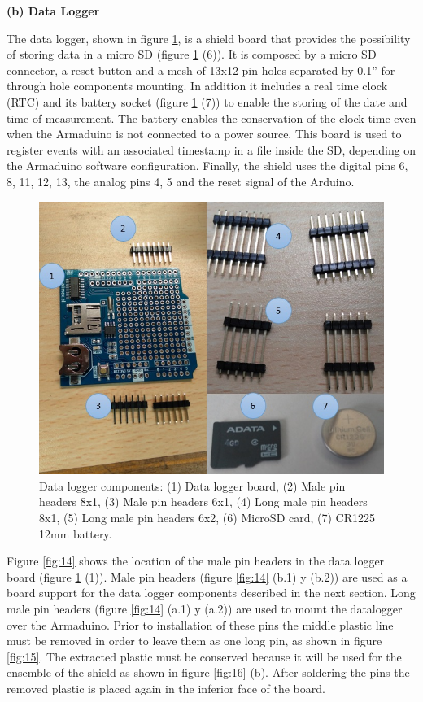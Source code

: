 \documentclass[12pt,letterpaper]{article}
\numberwithin{figure}{section}
\numberwithin{equation}{section}
\numberwithin{table}{section}
\begin{document}
\begin{flushleft}
\textbf{(b) Data Logger}
\end{flushleft}

The data logger, shown in figure \ref{fig:13}, is a shield board that provides the possibility of storing data in a micro SD (figure \ref{fig:13} (6)). It is composed by a micro SD connector, a reset button and a mesh of 13x12 pin holes separated by 0.1'' for through hole components mounting. In addition it includes a real time clock (RTC) and its battery socket (figure \ref{fig:13} (7)) to enable the storing of the date and time of measurement. The battery enables the conservation of the clock time even when the Armaduino is not connected to a power source. This board is used to register events with an associated timestamp in a file inside the SD, depending on the Armaduino software configuration. Finally, the shield uses the digital pins 6, 8, 11, 12, 13, the analog pins 4, 5 and the reset signal of the Arduino.

\begin{figure}[H]
    \centering
    \includegraphics[scale=0.5]{Figuras/figure_13.jpg}
    \caption{Data logger components: (1) Data logger board, (2) Male pin headers 8x1, (3) Male pin headers 6x1, (4) Long male pin headers 8x1, (5) Long male pin headers 6x2, (6) MicroSD card, (7) CR1225 12mm battery.}
    \label{fig:13}
\end{figure}

Figure \ref{fig:14} shows the location of the male pin headers in the data logger board (figure \ref{fig:13} (1)). Male pin headers (figure \ref{fig:14} (b.1) y (b.2)) are used as a board support for the data logger components described in the next section. Long male pin headers (figure \ref{fig:14} (a.1) y (a.2)) are used to mount the datalogger over the Armaduino. Prior to installation of these pins the middle plastic line must be removed in order to leave them as one long pin, as shown in figure \ref{fig:15}. The extracted plastic must be conserved because it will be used for the ensemble of the shield as shown in figure \ref{fig:16} (b). After soldering the pins the removed plastic is placed again in the inferior face of the board.
\end{document}
